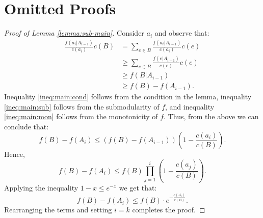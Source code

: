 \documentclass[a4paper,UKenglish,cleveref, autoref]{lipics-v2019}
\begin{document}
\section{Omitted Proofs}
\label{appendix:omitted}
\begin{proof}[Proof of Lemma \ref{lemma:sub-main}]
	

		Consider $a_i$ and observe that:
		\begin{align}
		\frac{f(a_i|A_{i-1})}{c(a_i)}c(B)
		& = \sum_{e \in B} \frac{f(a_i|A_{i-1})}{c(a_i)}c(e)
		\nonumber
		\\ 	& \geq \sum_{e \in B} \frac{f(e|A_{i-1})}{c(e)}c(e)
		\label{ineq:main:cond}
		\\	& \geq f(B|A_{i-1})
		\label{ineq:main:sub}
		\\ 	& \geq f(B) - f(A_{i-1}).
		\label{ineq:main:mon}
		\end{align}
		Inequality \eqref{ineq:main:cond} follows from the condition in the lemma, inequality \eqref{ineq:main:sub} follows from the submodularity of $f$, and inequality \eqref{ineq:main:mon} follows from the monotonicity of $f$.
		Thus, from the above we can conclude that:
		$$
		f(B) - f(A_i)  \leq (f(B) - f(A_{i - 1}))
		\left(1 - \frac{c(a_i)}{c(B)}\right).
		$$
		Hence,
		$$
		f(B) - f(A_i)  \leq f(B) \prod_{j = 1}^{i}
		\left(1 - \frac{c(a_j)}{c(B)}\right).
		$$
		Applying the inequality $1 - x \leq e^{-x}$ we get that:
		$$
		f(B) - f(A_i)  \leq f(B)\cdot
		e^{-\frac{c(A_i)}{c(B)}}.
		$$
		Rearranging the terms and setting $i = k$ completes the proof.

	
	
	
\end{proof}
\end{document}
